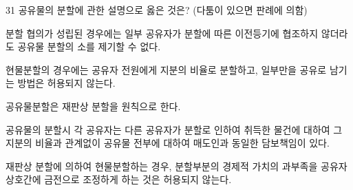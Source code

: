 \begin{question}{31}
공유물의 분할에 관한 설명으로 옳은 것은? (다툼이 있으면 판례에 의함)
\begin{choices}
  \item 분할 협의가 성립된 경우에는 일부 공유자가 분할에 따른 이전등기에 협조하지 않더라도 공유물 분할의 소를 제기할 수 없다.
  \item 현물분할의 경우에는 공유자 전원에게 지분의 비율로 분할하고, 일부만을 공유로 남기는 방법은 허용되지 않는다.
  \item 공유물분할은 재판상 분할을 원칙으로 한다.
  \item 공유물의 분할시 각 공유자는 다른 공유자가 분할로 인하여 취득한 물건에 대하여 그 지분의 비율과 관계없이 공유물 전부에 대하여 매도인과 동일한 담보책임이 있다.
  \item 재판상 분할에 의하여 현물분할하는 경우, 분할부분의 경제적 가치의 과부족을 공유자 상호간에 금전으로 조정하게 하는 것은 허용되지 않는다.
\end{choices}
\end{question}
